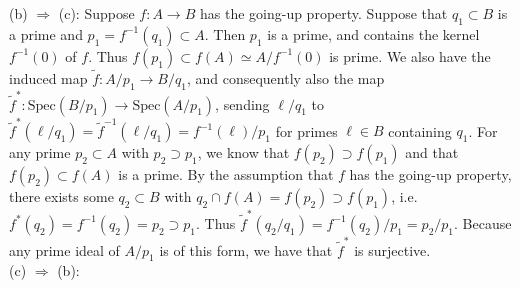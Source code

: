 \documentclass[11pt]{article}
\begin{document}
(b) $\Rightarrow$ (c): Suppose $f:A\rightarrow B$ has the going-up property. Suppose that $q_1\subset B$ is a prime and $p_1=f^{-1}(q_1)\subset A$. Then $p_1$ is a prime, and contains the kernel $f^{-1}(0)$ of $f$. Thus $f(p_1)\subset f(A)\simeq A/f^{-1}(0)$ is prime. We also have the induced map $\tilde{f}:A/p_1\rightarrow B/q_1$, and consequently also the map $\tilde{f}^*:\text{Spec}(B/p_1)\rightarrow\text{Spec}(A/p_1)$, sending $\ell/q_1$ to $\tilde{f}^*(\ell/q_1)=\tilde{f}^{-1}(\ell/q_1)=f^{-1}(\ell)/p_1$ for primes $\ell\in B$ containing $q_1$. For any prime $p_2\subset A$ with $p_2\supset p_1$, we know that $f(p_2)\supset f(p_1)$ and that $f(p_2)\subset f(A)$ is a prime. By the assumption that $f$ has the going-up property, there exists some $q_2\subset B$ with $q_2\cap f(A)=f(p_2)\supset f(p_1)$, i.e. $f^*(q_2)=f^{-1}(q_2)=p_2\supset p_1$. Thus $\tilde{f}^*(q_2/q_1)=f^{-1}(q_2)/p_1=p_2/p_1$. Because any prime ideal of $A/p_1$ is of this form, we have that $\tilde{f}^*$ is surjective.\\

(c) $\Rightarrow$ (b):      \\

%





     
\end{document}
